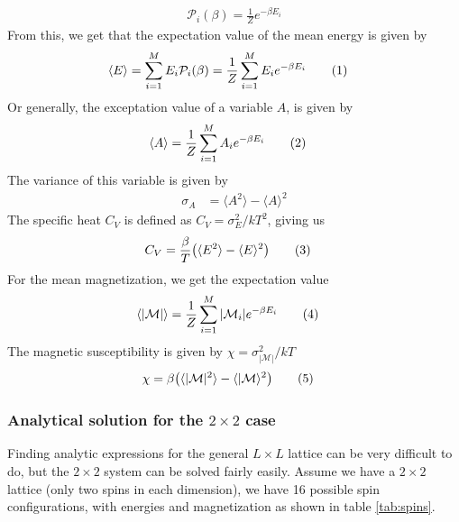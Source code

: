 \documentclass{article}
\newcommand\numberthis{\addtocounter{equation}{1}\tag{\theequation}}
\begin{document}
\begin{align*}
  \mathcal{P}_i(\beta) = \frac{1}{Z}e^{-\beta E_i}
\end{align*}
From this, we get that the expectation value of the mean energy is given by
\begin{align*}
  \langle E\rangle &= \sum\limits_{i=1}^ME_i\mathcal{P}_i(\beta) = \frac{1}{Z}\sum\limits_{i=1}^ME_ie^{-\beta E_i}\numberthis\label{eq:E_exp}
\end{align*}
Or generally, the exceptation value of a variable $A$, is given by
\begin{align*}
  \langle A\rangle &= \frac{1}{Z}\sum\limits_{i=1}^MA_ie^{-\beta E_i}\numberthis\label{eq:expectation_value}
\end{align*}
The variance of this variable is given by
\begin{align*}
  \sigma_A &= \langle A^2\rangle - \langle A\rangle^2
\end{align*}
The specific heat $C_V$ is defined as $C_V = \sigma_E^2/kT^2$, giving us
\begin{align*}
  C_V &= \frac{\beta}{T}\big(\langle E^2\rangle - \langle E\rangle^2\big)\numberthis\label{eq:heat_capacity}
\end{align*}
For the mean magnetization, we get the expectation value
\begin{align*}
  \langle |\mathcal{M}|\rangle &= \frac{1}{Z}\sum\limits_{i=1}^M|\mathcal{M}_i|e^{-\beta E_i}\numberthis\label{eq:M_exp}
\end{align*}
The magnetic susceptibility is given by $\chi = \sigma_{|\mathcal{M}|}^2/kT$
\begin{align*}
  \chi &= \beta\big(\langle|\mathcal{M}|^2\rangle - \langle|\mathcal{M}\rangle^2\big)\numberthis\label{eq:magnetic_susceptibility}
\end{align*}

\subsubsection{Analytical solution for the $2\times2$ case}
Finding analytic expressions for the general $L\times L$ lattice can be very difficult to do, but the $2\times2$ system can be solved fairly easily. Assume we have a $2\times2$ lattice (only two spins in each dimension), we have 16 possible spin configurations, with energies and magnetization as shown in table \ref{tab:spins}.
\end{document}
